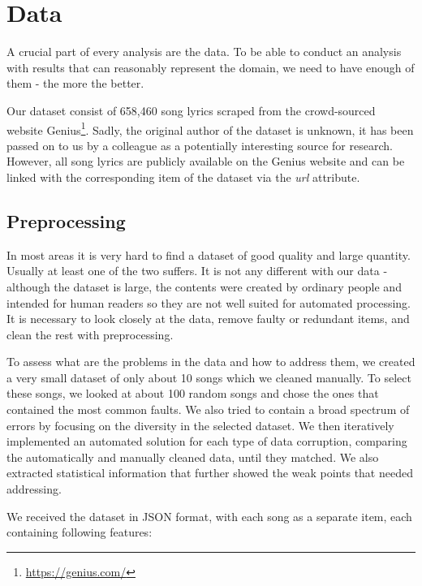 \chapter{Data}

A crucial part of every analysis are the data. To be able to conduct an analysis with results that can reasonably represent the domain, we need to have enough of them - the more the better. 

Our dataset consist of 658,460 song lyrics scraped from the crowd-sourced website 
Genius\footnote{\url{https://genius.com/}}. Sadly, the original author of the dataset is unknown, it has been passed on to us by a colleague as a potentially interesting source for research. However, all song lyrics are publicly available on the Genius website and can be linked with the corresponding item of the dataset via the \textit{url} attribute.


\section{Preprocessing}

In most areas it is very hard to find a dataset of good quality and large quantity. Usually at least one of the two suffers. It is not any different with our data - although the dataset is large, the contents were created by ordinary people and intended for human readers so they are not well suited for automated processing. It is necessary to look closely at the data, remove faulty or redundant items, and clean the rest with preprocessing.

To assess what are the problems in the data and how to address them, we created a very small dataset of only about 10 songs which we cleaned manually. To select these songs, we looked at about 100 random songs and chose the ones that contained the most common faults. We also tried to contain a broad spectrum of errors by focusing on the diversity in the selected dataset. We then iteratively implemented an automated solution for each type of data corruption, comparing the automatically and manually cleaned data, until they matched. We also extracted statistical information that further showed the weak points that needed addressing.

We received the dataset in JSON format, with each song as a separate item, each containing following features:

